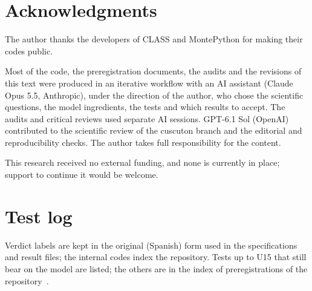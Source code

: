 \documentclass[11pt,a4paper]{article}
\begin{document}
\section*{Acknowledgments}

The author thanks the developers of CLASS and MontePython for making their codes public.

Most of the code, the preregistration documents, the audits and the revisions of this text were produced in an iterative workflow with an AI assistant (Claude Opus 5.5, Anthropic), under the direction of the author, who chose the scientific questions, the model ingredients, the tests and which results to accept.
The audits and critical reviews used separate AI sessions. GPT-6.1 Sol (OpenAI) contributed to the scientific review of the cuscuton branch and the editorial and reproducibility checks.
The author takes full responsibility for the content.

This research received no external funding, and none is currently in place; support to continue it would be welcome.

\appendix
\section{Test log}
\label{app:log}

Verdict labels are kept in the original (Spanish) form used in the specifications and result files; the internal codes index the repository.
Tests up to U15 that still bear on the model are listed; the others are in the index of preregistrations of the repository~\cite{whalefall_chain}.
\end{document}
